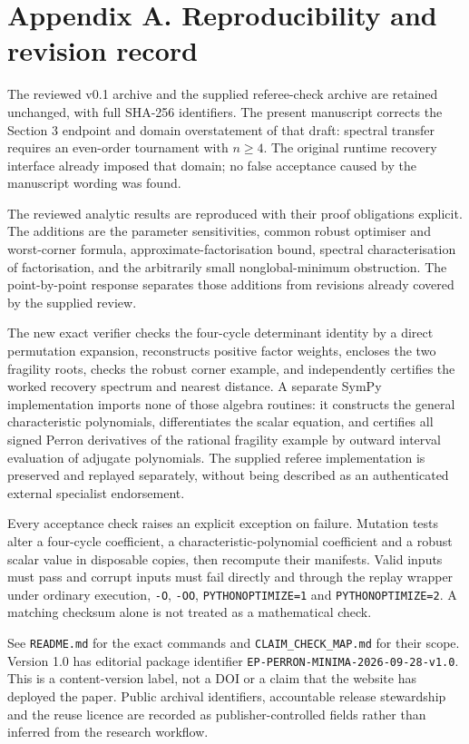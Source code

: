 \documentclass[
  11pt,
  a4paper,
]{article}
\begin{document}
\section{Appendix A. Reproducibility and revision
record}\label{appendix-a.-reproducibility-and-revision-record}

The reviewed v0.1 archive and the supplied referee-check archive are
retained unchanged, with full SHA-256 identifiers. The present
manuscript corrects the Section 3 endpoint and domain overstatement of
that draft: spectral transfer requires an even-order tournament with
\(n\ge4\). The original runtime recovery interface already imposed that
domain; no false acceptance caused by the manuscript wording was found.

The reviewed analytic results are reproduced with their proof
obligations explicit. The additions are the parameter sensitivities,
common robust optimiser and worst-corner formula,
approximate-factorisation bound, spectral characterisation of
factorisation, and the arbitrarily small nonglobal-minimum obstruction.
The point-by-point response separates those additions from revisions
already covered by the supplied review.

The new exact verifier checks the four-cycle determinant identity by a
direct permutation expansion, reconstructs positive factor weights,
encloses the two fragility roots, checks the robust corner example, and
independently certifies the worked recovery spectrum and nearest
distance. A separate SymPy implementation imports none of those algebra
routines: it constructs the general characteristic polynomials,
differentiates the scalar equation, and certifies all signed Perron
derivatives of the rational fragility example by outward interval
evaluation of adjugate polynomials. The supplied referee implementation
is preserved and replayed separately, without being described as an
authenticated external specialist endorsement.

Every acceptance check raises an explicit exception on failure. Mutation
tests alter a four-cycle coefficient, a characteristic-polynomial
coefficient and a robust scalar value in disposable copies, then
recompute their manifests. Valid inputs must pass and corrupt inputs
must fail directly and through the replay wrapper under ordinary
execution, \texttt{-O}, \texttt{-OO}, \texttt{PYTHONOPTIMIZE=1} and
\texttt{PYTHONOPTIMIZE=2}. A matching checksum alone is not treated as a
mathematical check.

See \texttt{README.md} for the exact commands and
\texttt{CLAIM\_CHECK\_MAP.md} for their scope. Version 1.0 has editorial
package identifier \texttt{EP-PERRON-MINIMA-2026-09-28-v1.0}. This is a
content-version label, not a DOI or a claim that the website has
deployed the paper. Public archival identifiers, accountable release
stewardship and the reuse licence are recorded as publisher-controlled
fields rather than inferred from the research workflow.
\end{document}
